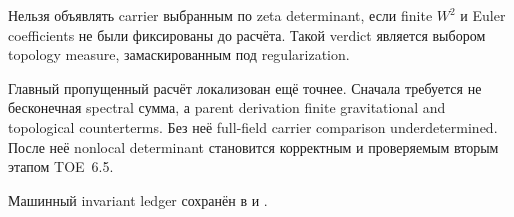 \begin{nogocriterion}
Нельзя объявлять carrier выбранным по zeta determinant, если finite
\(W^2\) и Euler coefficients не были фиксированы до расчёта. Такой verdict
является выбором topology measure, замаскированным под regularization.
\end{nogocriterion}

\begin{theorem}
Главный пропущенный расчёт локализован ещё точнее. Сначала требуется не
бесконечная spectral сумма, а parent derivation finite gravitational and
topological counterterms. Без неё full-field carrier comparison
underdetermined. После неё nonlocal determinant становится корректным и
проверяемым вторым этапом TOE~6.5.
\end{theorem}

Машинный invariant ledger сохранён в
 и
.